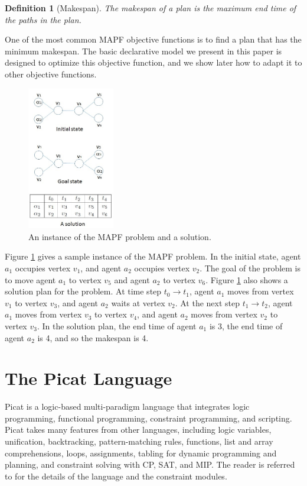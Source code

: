 \documentclass[conference]{IEEEtran}
\newtheorem{definition}{Definition}
\begin{document}
\begin{definition}[Makespan]
The \textit{makespan} of a plan is the maximum end time of the paths in the plan. 
\end{definition}

%
One of the most common MAPF objective functions is to find a plan that has the minimum makespan. 
The basic declarative model we present in this paper is designed to optimize this objective function, and we show later how to adapt it to other objective functions. 


\begin{figure}[!t]
\centering
\includegraphics[width=1.5in]{mapf_ex.jpg}
\caption{An instance of the MAPF problem and a solution.}
\label{fig:mapf_ex}
\end{figure}

Figure \ref{fig:mapf_ex} gives a sample instance of the MAPF problem. In the initial state, agent $a_1$ occupies vertex $v_1$, and agent $a_2$ occupies vertex $v_2$. The goal of the problem is to move agent $a_1$  to vertex $v_5$ and agent $a_2$  to vertex $v_6$. Figure \ref{fig:mapf_ex} also shows a solution plan for the problem. At time step $t_0 \rightarrow t_1$, agent $a_1$ moves from vertex $v_1$ to vertex $v_3$, and agent $a_2$ waits at vertex $v_2$. At the next step $t_1 \rightarrow t_2$, agent $a_1$ moves from vertex $v_3$ to vertex $v_4$, and agent $a_2$ moves from vertex $v_2$ to vertex $v_3$. In the solution plan, the end time of agent $a_1$ is 3, the end time of agent $a_2$ is 4, and so the  makespan is 4. %

\section{The Picat Language}
Picat is a logic-based multi-paradigm language that integrates logic programming, functional programming, constraint programming, and scripting. Picat takes many features from other languages, including logic variables, unification, backtracking,  pattern-matching rules, functions, list and array comprehensions, loops, assignments, tabling for dynamic programming and planning, and constraint solving with CP, SAT, and MIP. The reader is referred to \cite{PicatBook15} for the details of the language and the constraint modules.
\end{document}
